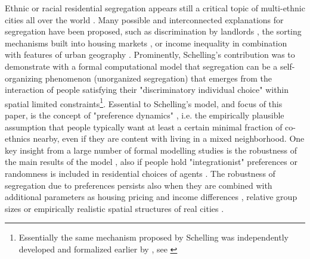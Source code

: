 \documentclass{article}
\begin{document}

Ethnic or racial residential segregation appears still a critical topic of multi-ethnic cities all over the world \autocite{charles2003dynamics}. Many possible and interconnected explanations for segregation have been proposed, such as discrimination by landlords \autocite{ahmed2008discrimination}, the sorting mechanisms built into housing markets \autocite{bailey2012spatial}, or income inequality in combination with features of urban geography \autocite{pais2017intergenerational}. Prominently, Schelling's contribution was to demonstrate   \autocite{schelling1969models,schelling1971dynamic} with a formal computational model that segregation can be a self-organizing phenomenon (unorganized segregation) that emerges from the interaction of people satisfying their "discriminatory individual choice" \textcite[p. 488]{schelling1969models} within spatial limited constraints\footnote{Essentially the same mechanism proposed by Schelling was independently developed and formalized earlier by \textcite{sakoda1971checkerboard}, see \textcite{hegselmann2017thomas}}. Essential to Schelling's model, and focus of this paper, is the concept of "preference dynamics" \autocite{clark2008understanding}, i.e. the empirically plausible assumption that people typically want at least a certain minimal fraction of co-ethnics nearby, even if they are content with living in a mixed neighborhood. One key insight from a large number of formal modelling studies is the robustness of the main results of the model \autocite{flache2020analytical}, also if people hold "integrationist" preferences \autocite{zhang2004} or randomness is included in residential choices of agents \autocite{bruch2006neighborhood,van2009neighborhood,bruch2009preferences}. The robustness of segregation due to preferences persists also when they are combined with additional parameters as housing pricing and income differences \autocite{fossett2006ethnic}, relative group sizes \autocite{bruch2014population} or empirically realistic spatial structures of real cities \autocite{benenson2009schelling}.
\end{document}
